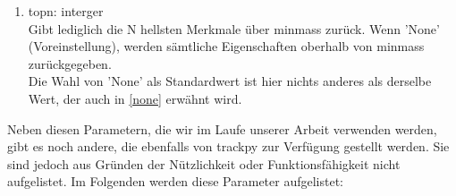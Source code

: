 \begin{enumerate}
    			\item topn: interger\\
    			Gibt lediglich die N hellsten Merkmale über minmass zurück. Wenn 'None' (Voreinstellung), werden sämtliche Eigenschaften oberhalb von minmass zurückgegeben. \\
    			Die Wahl von 'None' als Standardwert ist hier nichts anderes als derselbe Wert, der auch in \ref{none} erwähnt wird.
    			
    			
		\end{enumerate}
		
Neben diesen Parametern, die wir im Laufe unserer Arbeit verwenden werden, gibt es noch andere, die ebenfalls von trackpy zur Verfügung gestellt werden. Sie sind jedoch aus Gründen der Nützlichkeit oder Funktionsfähigkeit nicht aufgelistet. Im Folgenden werden diese Parameter aufgelistet:

